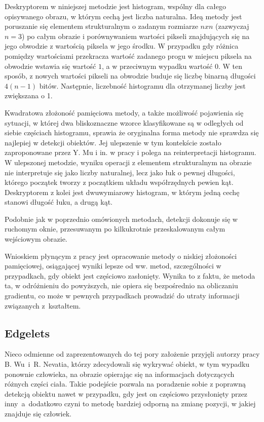Deskryptorem w niniejszej metodzie jest histogram, wspólny dla całego opisywanego obrazu, w którym cechą jest liczba naturalna. Ideą metody jest poruszanie się elementem strukturalnym o zadanym rozmiarze $n x n$ (zazwyczaj $n=3$) po całym obrazie i porównywaniem wartości pikseli znajdujących się na jego obwodzie z wartością piksela w jego środku. W przypadku gdy różnica pomiędzy wartościami przekracza wartość zadanego progu w miejscu piksela na obwodzie wstawia się wartość $1$, a w przeciwnym wypadku wartość $0$. W ten sposób, z nowych wartości pikseli na obwodzie buduje się liczbę binarną długości $4(n-1)$ bitów. Następnie, liczebność histogramu dla otrzymanej liczby jest zwiększana o 1.

Kwadratowa złożoność pamięciowa metody, a także możliwość pojawienia się sytuacji, w której dwa bliskoznaczne wzorce klasyfikowane są w odległych od siebie częściach histogramu, sprawia że oryginalna forma metody nie sprawdza się najlepiej w detekcji obiektów. Jej ulepszenie w tym kontekście zostało zaproponowane przez Y. Mu i in. w pracy \cite{Mu08} i polega na reinterpretacji histogramu.
W ulepszonej metodzie, wyniku operacji z elementem strukturalnym na obrazie nie interpretuje się jako liczby naturalnej, lecz jako łuk o pewnej długości, którego początek tworzy z początkiem układu współrzędnych pewien kąt. Deskryptorem z kolei jest dwuwymiarowy histogram, w którym jedną cechę stanowi długość łuku, a drugą kąt. 

Podobnie jak w poprzednio omówionych metodach, detekcji dokonuje się w ruchomym oknie, przesuwanym po kilkukrotnie przeskalowanym całym wejściowym obrazie.

Wnioskiem płynącym z pracy \cite{Mu08} jest opracowanie metody o niskiej złożoności pamięciowej, osiągającej wyniki lepsze od ww. metod, szczególności w przypadkach, gdy obiekt jest częściowo zasłonięty. Wynika to z faktu, że metoda ta, w odróżnieniu do powyższych, nie opiera się bezpośrednio na obliczaniu gradientu, co może w pewnych przypadkach prowadzić do utraty informacji związanych z~kształtem. 


\subsection{Edgelets}
Nieco odmienne od zaprezentowanych do tej pory założenie przyjęli autorzy pracy \cite{Wu05} B. Wu~i~R. Nevatia, którzy zdecydowali się wykrywać obiekt, w tym wypadku ponownie człowieka, na obrazie opierając się na informacjach dotyczących różnych części ciała. Takie podejście pozwala na poradzenie sobie z poprawną detekcją obiektu nawet w przypadku, gdy jest on częściowo przysłonięty przez inny~a~dodatkowo czyni to metodę bardziej odporną na zmianę pozycji, w jakiej znajduje się człowiek.

